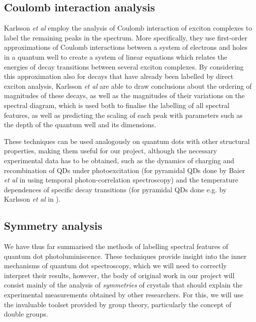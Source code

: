 \documentclass[12pt]{article}
\begin{document}
\subsection{Coulomb interaction analysis}
Karlsson \textit{et al} employ the analysis of Coulomb interaction of exciton complexes to label the remaining peaks in the spectrum. More specifically, they use first-order approximations of Coulomb interactions between a system of electrons and holes in a quantum well to create a system of linear equations which relates the energies of decay transitions between several exciton complexes. By considering this approximation also for decays that have already been labelled by direct exciton analysis, Karlsson \textit{et al} are able to draw conclusions about the ordering of magnitudes of these decays, as well as the magnitudes of their variations on the spectral diagram, which is used both to finalise the labelling of all spectral features, as well as predicting the scaling of each peak with parameters such as the depth of the quantum well and its dimensions.

These techniques can be used analogously on quantum dots with other structural properties, making them useful for our project, although the necessary experimental data has to be obtained, such as the dynamics of charging and recombination of QDs under photoexcitation (for pyramidal QDs done by Baier \textit{et al} in \cite{pyramid_dynamics} using temporal photon-correlation spectroscopy) and the temperature dependences of specific decay transitions (for pyramidal QDs done e.g. by Karlsson \textit{et al} in \cite{pyramid_temperature}).

\subsection{Symmetry analysis}

We have thus far summarised the methods of labelling spectral features of quantum dot photoluminiscence. These techniques provide insight into the inner mechanisms of quantum dot spectroscopy, which we will need to correctly interpret their results, however, the body of original work in our project will consist mainly of the analysis of \textit{symmetries} of crystals that should explain the experimental measurements obtained by other researchers. For this, we will use the invaluable toolset provided by group theory, particularly the concept of double groups.
\end{document}
